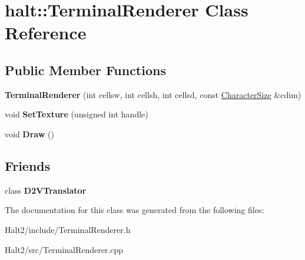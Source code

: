 \hypertarget{classhalt_1_1_terminal_renderer}{\section{halt\-:\-:\-Terminal\-Renderer \-Class \-Reference}
\label{classhalt_1_1_terminal_renderer}
}
\subsection*{\-Public \-Member \-Functions}
\begin{DoxyCompactItemize}
\item 
\hypertarget{classhalt_1_1_terminal_renderer_a061a894e06851983056004a95afe00fe}{{\bfseries \-Terminal\-Renderer} (int cellsw, int cellsh, int cellsd, const \hyperlink{structhalt_1_1_character_size}{\-Character\-Size} \&cdim)}\label{classhalt_1_1_terminal_renderer_a061a894e06851983056004a95afe00fe}

\item 
\hypertarget{classhalt_1_1_terminal_renderer_a14e774e6843a26960cd4518f3f1a48d8}{void {\bfseries \-Set\-Texture} (unsigned int handle)}\label{classhalt_1_1_terminal_renderer_a14e774e6843a26960cd4518f3f1a48d8}

\item 
\hypertarget{classhalt_1_1_terminal_renderer_a8cfde4444db255e5672f133629dc0809}{void {\bfseries \-Draw} ()}\label{classhalt_1_1_terminal_renderer_a8cfde4444db255e5672f133629dc0809}

\end{DoxyCompactItemize}
\subsection*{\-Friends}
\begin{DoxyCompactItemize}
\item 
\hypertarget{classhalt_1_1_terminal_renderer_a97f07e7e9910bda02082e3adda711d16}{class {\bfseries \-D2\-V\-Translator}}\label{classhalt_1_1_terminal_renderer_a97f07e7e9910bda02082e3adda711d16}

\end{DoxyCompactItemize}


\-The documentation for this class was generated from the following files\-:\begin{DoxyCompactItemize}
\item 
\-Halt2/include/\-Terminal\-Renderer.\-h\item 
\-Halt2/src/\-Terminal\-Renderer.\-cpp\end{DoxyCompactItemize}
